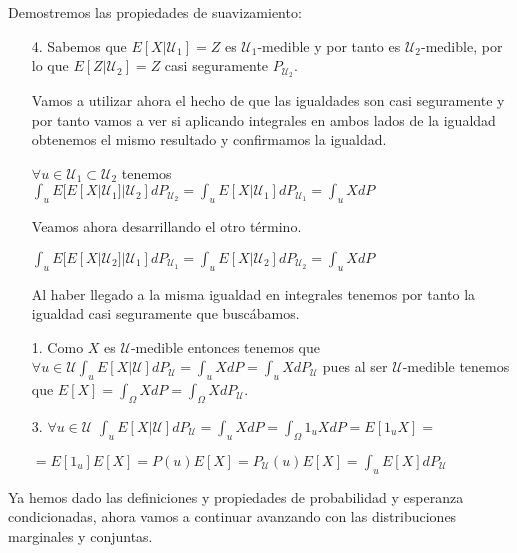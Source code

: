 \begin{demostracion}
	Demostremos las propiedades de suavizamiento:
	\begin{enumerate}
		\item[4.] Sabemos que $E[X | \mathcal{U}_1] = Z$ es $\mathcal{U}_1$-medible y por tanto es $\mathcal{U}_2$-medible, por lo que $E[Z | \mathcal{U}_2] = Z$ casi seguramente $P_{\mathcal{U}_2}$.
		
		Vamos a utilizar ahora el hecho de que las igualdades son casi seguramente y por tanto vamos a ver si aplicando integrales en ambos lados de la igualdad obtenemos el mismo resultado y confirmamos la igualdad.
		
		$\forall u\in \mathcal{U}_1 \subset \mathcal{U}_2$ tenemos $\int_{u} E[E[X | \mathcal{U}_1] | \mathcal{U}_2]dP_{\mathcal{U}_2} = \int_{u}E[X | \mathcal{U}_1]dP_{\mathcal{U}_1} = \int_{u}XdP$
		
		Veamos ahora desarrillando el otro término.
		
		$\int_{u} E[E[X | \mathcal{U}_2] | \mathcal{U}_1]dP_{\mathcal{U}_1} = \int_{u}E[X | \mathcal{U}_2] dP_{\mathcal{U}_2} = \int_{u}XdP$
		
		Al haber llegado a la misma igualdad en integrales tenemos por tanto la igualdad casi seguramente que buscábamos.
		\item[1.] Como $X$ es $\mathcal{U}$-medible entonces tenemos que $\forall u \in \mathcal{U} \int_{u}E[X | \mathcal{U}] dP_{\mathcal{U}} = \int_{u}XdP = \int_{u}XdP_{\mathcal{U}}$ pues al ser $\mathcal{U}$-medible tenemos que $E[X] = \int_{\Omega} XdP = \int_{\Omega}XdP_{\mathcal{U}}$.
		\item[3.] $\forall u \in \mathcal{U}$ $\int_{u}E[X | \mathcal{U}]dP_{\mathcal{U}} = \int_{u} XdP = \int_{\Omega}1_{u}XdP = E[1_u X] = $
		
		$= E[1_u]E[X] = P(u)E[X] = P_{\mathcal{U}}(u)E[X] = \int_{u}E[X]dP_{\mathcal{U}}$
	\end{enumerate}
\end{demostracion}

Ya hemos dado las definiciones y propiedades de probabilidad y esperanza condicionadas, ahora vamos a continuar avanzando con las distribuciones marginales y conjuntas.